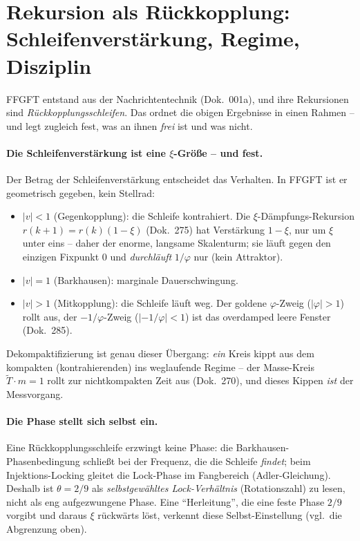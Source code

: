 \section{Rekursion als Rückkopplung: Schleifenverstärkung, Regime, Disziplin}
FFGFT entstand aus der Nachrichtentechnik (Dok.~001a), und ihre Rekursionen sind
\emph{Rückkopplungsschleifen}. Das ordnet die obigen Ergebnisse in einen Rahmen -- und legt zugleich
fest, was an ihnen \emph{frei} ist und was nicht.

\paragraph{Die Schleifenverstärkung ist eine $\xi$-Größe -- und fest.} Der Betrag der
Schleifenverstärkung entscheidet das Verhalten. In FFGFT ist er geometrisch gegeben, kein Stellrad:
\begin{itemize}
\item $|v|<1$ (Gegenkopplung): die Schleife kontrahiert. Die $\xi$-Dämpfungs-Rekursion
$r(k{+}1)=r(k)(1-\xi)$ (Dok.~275) hat Verstärkung $1-\xi$, nur um $\xi$ unter eins -- daher der enorme,
langsame Skalenturm; sie läuft gegen den einzigen Fixpunkt $0$ und \emph{durchläuft} $1/\varphi$ nur
(kein Attraktor).
\item $|v|=1$ (Barkhausen): marginale Dauerschwingung.
\item $|v|>1$ (Mitkopplung): die Schleife läuft weg. Der goldene $\varphi$-Zweig ($|\varphi|>1$) rollt
aus, der $-1/\varphi$-Zweig ($|-1/\varphi|<1$) ist das overdamped leere Fenster (Dok.~285).
\end{itemize}
Dekompaktifizierung ist genau dieser Übergang: \emph{ein} Kreis kippt aus dem kompakten
(kontrahierenden) ins weglaufende Regime -- der Masse-Kreis $\tilde T\cdot m=1$ rollt zur nichtkompakten
Zeit aus (Dok.~270), und dieses Kippen \emph{ist} der Messvorgang.

\paragraph{Die Phase stellt sich selbst ein.} Eine Rückkopplungsschleife erzwingt keine Phase: die
Barkhausen-Phasenbedingung schließt bei der Frequenz, die die Schleife \emph{findet}; beim
Injektions-Locking gleitet die Lock-Phase im Fangbereich (Adler-Gleichung). Deshalb ist $\theta=2/9$
als \emph{selbstgewähltes Lock-Verhältnis} (Rotationszahl) zu lesen, nicht als eng aufgezwungene Phase.
Eine \enquote{Herleitung}, die eine feste Phase $2/9$ vorgibt und daraus $\xi$ rückwärts löst, verkennt
diese Selbst-Einstellung (vgl.\ die Abgrenzung oben).

